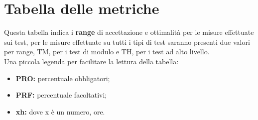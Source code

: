\documentclass[PianoDiProgetto.tex]{subfiles}
\begin{document}
\section{Tabella delle metriche}
Questa tabella indica i \textbf{range} di accettazione e ottimalità per le misure effettuate sui test, per le misure effettuate su tutti i tipi di test saranno presenti due valori per range, TM, per i test di modulo e TH, per i test ad alto livello.\\
Una piccola legenda per facilitare la lettura della tabella: \\
\begin{itemize}
\item \textbf{PRO:} percentuale  obbligatori;
\item \textbf{PRF:} percentuale  facoltativi;
\item \textbf{xh:} dove x è un numero, ore.
\end{itemize}
\end{document}
